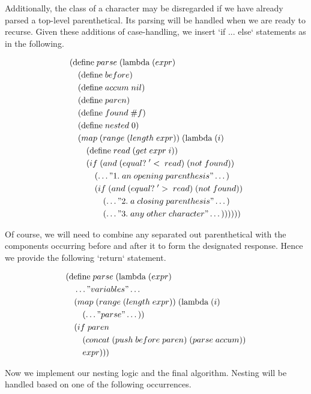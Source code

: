 Additionally, the class of a character may be disregarded if we have already parsed a 
top-level parenthetical. Its parsing will be handled when we are ready to recurse. Given 
these additions of case-handling, we insert `if ... else` statements as in the following.

\begin{align*}
& (\text{define} \; parse \; (\text{lambda} \; (expr) \; 
\\& \quad (\text{define} \; before)
\\& \quad (\text{define} \; accum \; nil)
\\& \quad (\text{define} \; paren)
\\& \quad (\text{define} \; found \; \#f)
\\& \quad (\text{define} \; nested \; 0)
\\& \quad (map \; (range \; (length \; expr)) \; (\text{lambda} \; (i)
\\& \qquad (\text{define} \; read \; (get \; expr \; i))
\\& \qquad (if \; (and \; (equal? \; '< \; read) \; (not \; found))
\\& \qquad \quad (\dots"1. \; an \; opening \; parenthesis"\dots)
\\& \qquad \quad (if \; (and \; (equal? \; '> \; read) \; (not \; found))
\\& \qquad \qquad (\dots"2. \; a \; closing \; parenthesis"\dots)
\\& \qquad \qquad (\dots"3. \; any \; other \; character"\dots))))))
\end{align*}

Of course, we will need to combine any separated out parenthetical with the components 
occurring before and after it to form the designated response. Hence we provide the 
following `return` statement.

\begin{align*}
& (\text{define} \; parse \; (\text{lambda} \; (expr) \; 
\\& \quad \dots"variables"\dots
\\& \quad (map \; (range \; (length \; expr)) \; (\text{lambda} \; (i)
\\& \qquad (\dots"parse"\dots))
\\& \quad (if \; paren
\\& \qquad (concat \; (push \; before \; paren) \; (parse \; accum))
\\& \qquad expr)))
\end{align*}

Now we implement our nesting logic and the final algorithm. Nesting will be handled 
based on one of the following occurrences.

